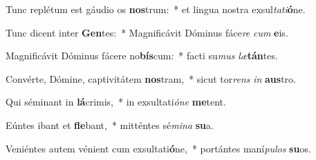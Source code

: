 \item Tunc replétum est gáudio os \textbf{nos}trum:~* et lingua nostra exsul\textit{ta}\textit{ti}\textbf{ó}ne.
\item Tunc dicent inter \textbf{Gen}tes:~* Magnificávit Dóminus fáce\textit{re} \textit{cum} \textbf{e}is.
\item Magnificávit Dóminus fácere no\textbf{bís}cum:~* facti su\textit{mus} \textit{læ}\textbf{tán}tes.
\item Convérte, Dómine, captivitátem \textbf{nos}tram,~* sicut tor\textit{rens} \textit{in} \textbf{aus}tro.
\item Qui séminant in \textbf{lá}crimis,~* in exsultati\textit{ó}\textit{ne} \textbf{me}tent.
\item Eúntes ibant et \textbf{fle}bant,~* mitténtes sé\textit{mi}\textit{na} \textbf{su}a.
\item Veniéntes autem vénient cum exsultati\textbf{ó}ne,~* portántes maní\textit{pu}\textit{los} \textbf{su}os.
